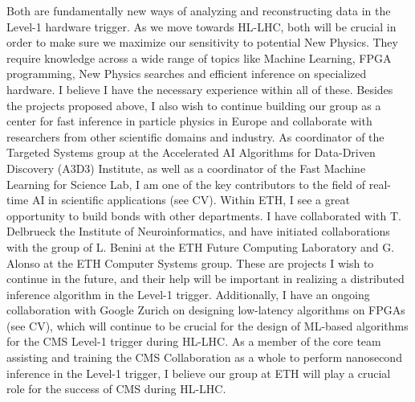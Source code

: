 \documentclass[12pt]{iopart}
\begin{document}
Both are fundamentally new ways of analyzing and reconstructing data in the Level-1 hardware trigger. As we move towards HL-LHC, both will be crucial in order to make sure we maximize our sensitivity to potential New Physics. They require knowledge across a wide range of topics like Machine Learning, FPGA programming, New Physics searches and efficient inference on specialized hardware. I believe I have the necessary experience within all of these. Besides the projects proposed above, I also wish to continue building our group as a center for fast inference in particle physics in Europe and collaborate with researchers from other scientific domains and industry. As coordinator of the Targeted Systems group at the Accelerated AI Algorithms for Data-Driven Discovery (A3D3) Institute, as well as a coordinator of the Fast Machine Learning for Science Lab, I am one of the key contributors to the field of real-time AI in scientific applications (see CV). Within ETH, I see a great opportunity to build bonds with other departments. I have collaborated with T. Delbrueck the Institute of Neuroinformatics, and have initiated collaborations with the group of L. Benini at the ETH Future Computing Laboratory and G. Alonso at the ETH Computer Systems group. These are projects I wish to continue in the future, and their help will be important in realizing a distributed inference algorithm in the Level-1 trigger. Additionally, I have an ongoing collaboration with Google Zurich on designing low-latency algorithms on FPGAs (see CV), which will continue to be crucial for the design of ML-based algorithms for the CMS Level-1 trigger during HL-LHC. As a member of the core team assisting and training the CMS Collaboration as a whole to perform nanosecond inference in the Level-1 trigger, I believe our group at ETH will play a crucial role for the success of CMS during HL-LHC.



\end{document}
